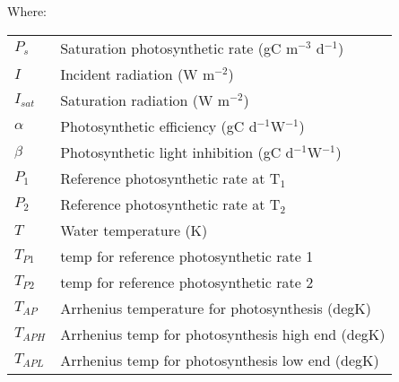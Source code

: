 \documentclass{deltares_manual}
\begin{document}
Where:\\
\begin{tabular}{ll}
$P_s$ & Saturation photosynthetic rate (gC m$^{-3}$ d$^{-1}$)\\
$I$ & Incident radiation (W m$^{-2}$)\\
$I_{sat}$ & Saturation radiation (W m$^{-2}$)\\
$\alpha$ & Photosynthetic efficiency (gC d$^{-1}$W$^{-1}$) \\
$\beta$ & Photosynthetic light inhibition (gC d$^{-1}$W$^{-1}$) \\
$P_1$ & Reference photosynthetic rate at T$_1$\\
$P_2$ & Reference photosynthetic rate at T$_2$\\
$T$ & Water temperature (K)\\
$T_{P1}$ & temp for reference photosynthetic rate 1\\
$T_{P2}$ & temp for reference photosynthetic rate 2	\\
$T_{AP}$ & Arrhenius temperature for photosynthesis               (degK)\\
$T_{APH}$ & Arrhenius temp for photosynthesis high end             (degK)\\
$T_{APL}$ & Arrhenius temp for photosynthesis low end             (degK)\\
\end{tabular}
\end{document}
